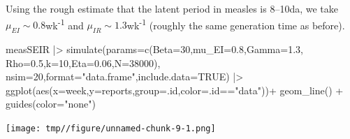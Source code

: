 \documentclass[
  ignorenonframetext,
  aspectratio=169,
  t]{beamer}
\newenvironment{Shaded}{\begin{snugshade}}{\end{snugshade}}
\newcommand{\AttributeTok}[1]{\textcolor[rgb]{0.40,0.45,0.13}{#1}}
\newcommand{\ConstantTok}[1]{\textcolor[rgb]{0.56,0.35,0.01}{#1}}
\newcommand{\DecValTok}[1]{\textcolor[rgb]{0.68,0.00,0.00}{#1}}
\newcommand{\FloatTok}[1]{\textcolor[rgb]{0.68,0.00,0.00}{#1}}
\newcommand{\FunctionTok}[1]{\textcolor[rgb]{0.28,0.35,0.67}{#1}}
\newcommand{\NormalTok}[1]{\textcolor[rgb]{0.00,0.23,0.31}{#1}}
\newcommand{\SpecialCharTok}[1]{\textcolor[rgb]{0.37,0.37,0.37}{#1}}
\newcommand{\StringTok}[1]{\textcolor[rgb]{0.13,0.47,0.30}{#1}}
\theoremstyle{definition}
\begin{document}
\begin{frame}[fragile]
Using the rough estimate that the latent period in measles is 8--10da,
we take \(\mu_{EI}\sim 0.8\)wk\textsuperscript{-1} and
\(\mu_{IR}\sim 1.3\)wk\textsuperscript{-1} (roughly the same generation
time as before).

\begin{Shaded}
\begin{Highlighting}[]
\NormalTok{measSEIR }\SpecialCharTok{|\textgreater{}}
  \FunctionTok{simulate}\NormalTok{(}\AttributeTok{params=}\FunctionTok{c}\NormalTok{(}\AttributeTok{Beta=}\DecValTok{30}\NormalTok{,}\AttributeTok{mu\_EI=}\FloatTok{0.8}\NormalTok{,}\AttributeTok{Gamma=}\FloatTok{1.3}\NormalTok{,}
                    \AttributeTok{Rho=}\FloatTok{0.5}\NormalTok{,}\AttributeTok{k=}\DecValTok{10}\NormalTok{,}\AttributeTok{Eta=}\FloatTok{0.06}\NormalTok{,}\AttributeTok{N=}\DecValTok{38000}\NormalTok{),}
    \AttributeTok{nsim=}\DecValTok{20}\NormalTok{,}\AttributeTok{format=}\StringTok{"data.frame"}\NormalTok{,}\AttributeTok{include.data=}\ConstantTok{TRUE}\NormalTok{) }\SpecialCharTok{|\textgreater{}}
  \FunctionTok{ggplot}\NormalTok{(}\FunctionTok{aes}\NormalTok{(}\AttributeTok{x=}\NormalTok{week,}\AttributeTok{y=}\NormalTok{reports,}\AttributeTok{group=}\NormalTok{.id,}\AttributeTok{color=}\NormalTok{.id}\SpecialCharTok{==}\StringTok{"data"}\NormalTok{))}\SpecialCharTok{+}
  \FunctionTok{geom\_line}\NormalTok{() }\SpecialCharTok{+} \FunctionTok{guides}\NormalTok{(}\AttributeTok{color=}\StringTok{"none"}\NormalTok{)}
\end{Highlighting}
\end{Shaded}

\begin{center}
\texttt{[image: tmp//figure/unnamed-chunk-9-1.png]}
\end{center}
\end{frame}
\end{document}
